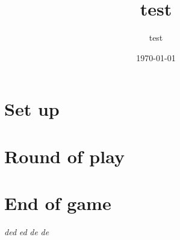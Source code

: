 \documentclass{article}%
\title{test}%
\author{test}%
\date{\today}%
\begin{document}
%
\pagestyle{empty}%
\normalsize%
\maketitle%
\section{ Set up
}%
\label{sec:Setup}%

%
\section{ Round of play
}%
\label{sec:Roundofplay}%

%
\section{ End of game
}%
\label{sec:Endofgame}%
\textit{ ded
}%
\textit{ ed
}%
\textit{ de
}%
\textit{ de}

%
\end{document}
